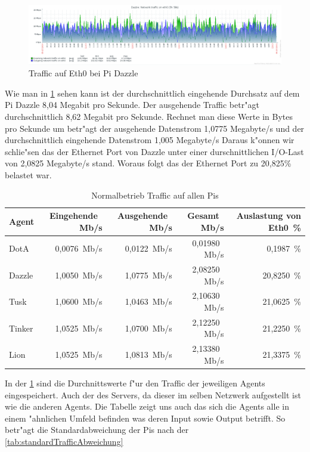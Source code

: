 \begin{figure}[htbp]
\centering
\includegraphics*[width=0.9\linewidth]{Abb/ZabbixDazzle/Standard/DazzleStandard}

\caption{Traffic auf Eth0 bei Pi Dazzle}
\label{fig:Eth0DazzleStandard}
\end{figure}

Wie man in \cref{fig:Eth0DazzleStandard} sehen kann ist der durchschnittlich eingehende Durchsatz auf dem Pi Dazzle 8,04 Megabit %
pro Sekunde. Der ausgehende Traffic betr"agt durchschnittlich 8,62 Megabit pro Sekunde. Rechnet man diese Werte in Bytes pro Sekunde um %
betr"agt der ausgehende Datenstrom 1,0775 Megabyte/s und der durchschnittlich eingehende Datenstrom 1,005 Megabyte/s %
Daraus k"onnen wir schlie"sen das der Ethernet Port von Dazzle unter einer durschnittlichen I/O-Last von 2,0825 Megabyte/s stand. %
Woraus folgt das der Ethernet Port zu 20,825\% belastet war.
\begin{table}
\centering
\begin{tabular}{l%
 r<{\,Mb/s}%
 r<{\,Mb/s}%
 r<{\,Mb/s}%
 r<{\,\%}%
}
Agent  	& Eingehende		& Ausgehende		& Gesamt		& Auslastung von Eth0	\\
\hline
DotA	& 0,0076		& 0,0122		& 0,01980		&  0,1987 		\\
Dazzle 	& 1,0050 		& 1,0775		& 2,08250		& 20,8250		\\
Tusk 	& 1,0600		& 1,0463		& 2,10630		& 21,0625		\\
Tinker	& 1,0525		& 1,0700		& 2,12250		& 21,2250		\\
Lion	& 1,0525		& 1,0813		& 2,13380		& 21,3375		\\
\end{tabular}
\caption{Normalbetrieb Traffic auf allen Pis}
\label{tab:standardTraffic}
\end{table}

In der \cref{tab:standardTraffic} sind die Durchnittswerte f"ur den Traffic der jeweiligen Agents eingespeichert. Auch der %
des Servers, da dieser im selben Netzwerk aufgestellt ist wie die anderen Agents. Die Tabelle zeigt uns auch %
das sich die Agents alle in einem "ahnlichen Umfeld befinden was deren Input sowie Output betrifft. So betr"agt die
Standardabweichung der Pis nach der \cref{tab:standardTrafficAbweichung}     

